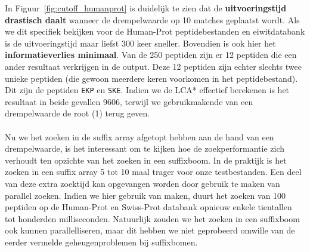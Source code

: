 In Figuur~\ref{fig:cutoff_humanprot} is duidelijk te zien dat de \textbf{uitvoeringstijd drastisch daalt} wanneer de drempelwaarde op 10 matches geplaatst wordt.
Als we dit specifiek bekijken voor de Human-Prot peptidebestanden en eiwitdatabank is de uitvoeringstijd maar liefst 300 keer sneller.
Bovendien is ook hier het \textbf{informatieverlies minimaal}.
Van de 250 peptiden zijn er 12 peptiden die een ander resultaat verkrijgen in de output.
Deze 12 peptiden zijn echter slechts twee unieke peptiden (die gewoon meerdere keren voorkomen in het peptidebestand).
Dit zijn de peptiden \texttt{EKP} en \texttt{SKE}.
Indien we de LCA* effectief berekenen is het resultaat in beide gevallen 9606, terwijl we gebruikmakende van een drempelwaarde de root (1) terug geven.
\\ \\
Nu we het zoeken in de suffix array afgetopt hebben aan de hand van een drempelwaarde, is het interessant om te kijken hoe de zoekperformantie zich verhoudt ten opzichte van het zoeken in een suffixboom.
In de praktijk is het zoeken in een suffix array 5 tot 10 maal trager voor onze testbestanden.
Een deel van deze extra zoektijd kan opgevangen worden door gebruik te maken van parallel zoeken.
Indien we hier gebruik van maken, duurt het zoeken van 100 peptiden op de Human-Prot en Swiss-Prot databank opnieuw enkele tientallen tot honderden milliseconden.
Natuurlijk zouden we het zoeken in een suffixboom ook kunnen parallelliseren, maar dit hebben we niet geprobeerd omwille van de eerder vermelde geheugenproblemen bij suffixbomen.


